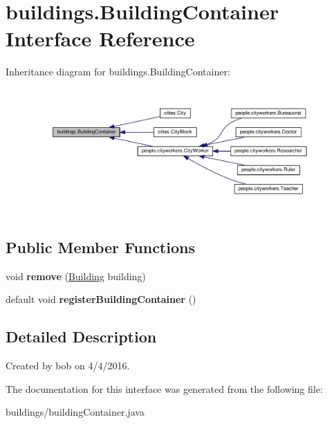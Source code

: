 \hypertarget{interfacebuildings_1_1_building_container}{}\section{buildings.\+Building\+Container Interface Reference}
\label{interfacebuildings_1_1_building_container}


Inheritance diagram for buildings.\+Building\+Container\+:\nopagebreak
\begin{figure}[H]
\begin{center}
\leavevmode
\includegraphics[width=350pt]{interfacebuildings_1_1_building_container__inherit__graph}
\end{center}
\end{figure}
\subsection*{Public Member Functions}
\begin{DoxyCompactItemize}
\item 
void {\bfseries remove} (\hyperlink{classbuildings_1_1_building}{Building} building)\hypertarget{interfacebuildings_1_1_building_container_aecd93de36b3b16cd4368f21d25fa4f19}{}\label{interfacebuildings_1_1_building_container_aecd93de36b3b16cd4368f21d25fa4f19}

\item 
default void {\bfseries register\+Building\+Container} ()\hypertarget{interfacebuildings_1_1_building_container_a8f8893530364c687212d7f4d0dc50aa2}{}\label{interfacebuildings_1_1_building_container_a8f8893530364c687212d7f4d0dc50aa2}

\end{DoxyCompactItemize}


\subsection{Detailed Description}
Created by bob on 4/4/2016. 

The documentation for this interface was generated from the following file\+:\begin{DoxyCompactItemize}
\item 
buildings/building\+Container.\+java\end{DoxyCompactItemize}
